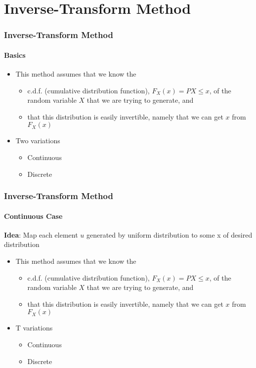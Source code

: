 \documentclass{beamer}
\begin{document}
\section{Inverse-Transform Method}


\begin{frame}
    \frametitle{Inverse-Transform Method}
    \framesubtitle{Basics}
	\begin{itemize}
		\item This method assumes that we know the
		\begin{itemize}
		\item c.d.f. (cumulative distribution function), $F_X (x) = P { X \leq 				x}$, of the random variable $X$ that we are trying to generate, and
		\item that this distribution is easily invertible, namely that we can 				get $x$ from $F_X (x)$
		\end{itemize}
		\item Two variations
		\begin{itemize}
		\item Continuous
		\item Discrete
		\end{itemize}
		
		  
	\end{itemize}	

\end{frame}


\begin{frame}
    \frametitle{Inverse-Transform Method}
    \framesubtitle{Continuous Case}
    \textbf{Idea}: Map each element $u$ generated by uniform distribution to some x of desired distribution
	\begin{itemize}
		\item This method assumes that we know the
		\begin{itemize}
		\item c.d.f. (cumulative distribution function), $F_X (x) = P { X \leq 				x}$, of the random variable $X$ that we are trying to generate, and
		\item that this distribution is easily invertible, namely that we can 				get $x$ from $F_X (x)$
		\end{itemize}
		\item T variations
		\begin{itemize}
		\item Continuous
		\item Discrete
		\end{itemize}
		
		  
	\end{itemize}	

\end{frame}
\end{document}
